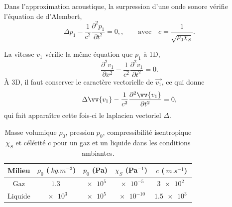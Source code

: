 \documentclass[12pt,fancy]{cours}
\begin{document}
\begin{theorem}\label{form:}
	Dans l'approximation acoustique, la surpression d'une onde sonore vérifie l’équation de d'Alembert,
$$
\Delta p_1-\frac{1}{c^2}\frac{\partial^2 p_1}{\partial t^2}=0,, \qquad\mathrm{avec}\quad c=\frac{1}{\sqrt{\rho_0\chi_S}}.
$$

\end{theorem}
\begin{remarque}
	
	La vitesse $v_1$ vérifie la même équation que $p_1$ à 1D,
	 \begin{equation}
	 \frac{\partial^2 v_1}{\partial x^2}-\frac{1}{c^2}\frac{\partial^2 v_1}{\partial t^2}=0.
	 \end{equation}
	 À 3D, il faut conserver le caractère vectorielle de $\Vec{v_1}$, ce qui donne
	  \begin{equation}
	 \Delta\vv{v_1}-\frac{1}{c^2}\frac{\partial^2 \vv{v_1}}{\partial t^2}=0,
	 \end{equation}
	 qui fait apparaître cette fois-ci le laplacien vectoriel $\Delta$.
\end{remarque}
%


 \begin{table}[h!]
	\centering
	\begin{tabular}{|c|c|c|c|c|}
	\hline
	Milieu & $\rho_0$ ($\SI{}{kg.m^{-3}}$) & $p_0$ (Pa) & $\chi_S$ (Pa$^{-1}$) & $c$ ($\SI{}{m.s^{-1}}$) \\
	\hline
	Gaz & $\SI{1.3}{}$ & $\SI{e5}{}$ & $\SI{e-5}{}$ & $\SI{3e2}{}$ \\
	\hline
	Liquide & $\SI{e3}{}$ & $\SI{e5}{}$ & $\SI{e-10}{}$ & $\SI{1.5 e3}{}$ \\
	\hline
	\end{tabular}
	
	\caption{Masse volumique $\rho_0$, pression $p_0$, compressibilité isentropique $\chi_S$ et célérité $c$ pour un gaz et un liquide dans les conditions ambiantes.
	}
	\label{}
	
 \end{table}
\end{document}
